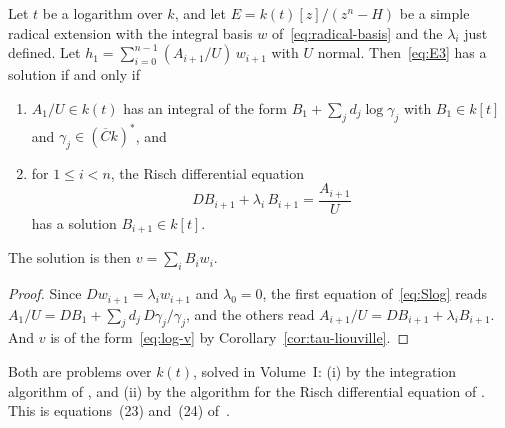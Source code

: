 \begin{theorem}\label{thm:log-radical}
Let $t$ be a logarithm over $k$, and let $E = k(t)[z]/(z^n - H)$ be a simple
radical extension with the integral basis $w$
of~\eqref{eq:radical-basis} and the $\lambda_i$ just defined. Let $h_1
= \sum_{i=0}^{n-1} (A_{i+1}/U)\, w_{i+1}$ with $U$ normal. Then~\eqref{eq:E3}
has a solution if and only if
\begin{enumerate}[label=\textup{(\roman*)}]
\item $A_1/U \in k(t)$ has an integral of the form $B_1 + \sum_j d_j \log
  \gamma_j$ with $B_1 \in k[t]$ and $\gamma_j \in (\overline{C} k)^*$, and
\item for $1 \le i < n$, the Risch differential equation
  \[
    DB_{i+1} + \lambda_i\, B_{i+1} = \frac{A_{i+1}}{U}
  \]
  has a solution $B_{i+1} \in k[t]$.
\end{enumerate}
The solution is then $v = \sum_i B_i w_i$.
\end{theorem}

\begin{proof}
Since $Dw_{i+1} = \lambda_i w_{i+1}$ and $\lambda_0 = 0$, the first equation
of~\eqref{eq:Slog} reads $A_1/U = DB_1 + \sum_j d_j\, D\gamma_j/\gamma_j$,
and the others read $A_{i+1}/U = DB_{i+1} + \lambda_i B_{i+1}$. And $v$ is of
the form~\eqref{eq:log-v} by Corollary~\ref{cor:tau-liouville}.
\end{proof}

Both are problems over $k(t)$, solved in Volume~I: (i) by the integration
algorithm of , and (ii) by the algorithm for the Risch
differential equation of . This is equations~(23) and~(24)
of~\cite[\S3.8]{bronstein1998tutorial}.

